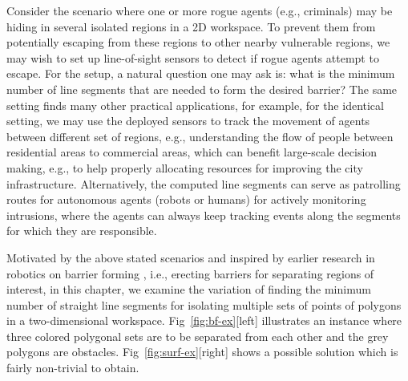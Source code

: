 Consider the scenario where one or more rogue agents (e.g., criminals) may be hiding in several isolated regions in a 2D workspace. To prevent them from potentially escaping from these regions to other nearby vulnerable regions, we may wish to set up line-of-sight sensors to detect if rogue agents attempt to escape. For the setup, a natural question one may ask is: what is the minimum number of line segments that are needed to form the desired barrier? The same setting finds many other practical applications, for example, for the identical setting, we may use the deployed sensors to track the movement of agents between different set of regions, e.g., understanding the flow of people between residential areas to commercial areas, which can benefit large-scale decision making, e.g., to help properly allocating resources for improving the city infrastructure. 
%
Alternatively, the computed line segments can serve as patrolling routes for autonomous agents (robots or humans) for actively monitoring intrusions, where the agents can always keep tracking events along the segments for which they are responsible.

%
Motivated by the above stated scenarios and inspired by earlier research in robotics on barrier forming \cite{kloder2007barrier,kloder2008partial}, i.e., erecting barriers for separating regions of interest, in this chapter, we examine the variation of finding the minimum number of straight line segments for isolating multiple sets of points of polygons in a two-dimensional workspace. 
Fig~\ref{fig:bf-ex}[left] illustrates an instance where three colored polygonal sets are to be separated from each other and the grey polygons are obstacles. Fig~\ref{fig:surf-ex}[right] shows a possible solution which is fairly non-trivial 
to obtain. 
%

